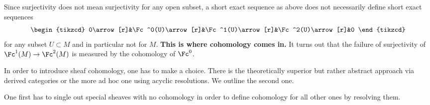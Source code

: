 \begin{remark}
	Since surjectivity does not mean surjectivity for any open subset, a short exact sequence as above does not necessarily define short exact sequences
	\[ \begin{tikzcd}
		0\arrow[r]&\Fc^0(U)\arrow[r]&\Fc^1(U)\arrow[r]&\Fc^2(U)\arrow[r]&0
	\end{tikzcd}\]
	for any subset $U\subset M$ and in particular not for $M$. \textbf{This is where cohomology comes in.} It turns out that the failure of surjectivity of $\Fc^1(M)\to\Fc^2(M)$ is measured by the cohomology of $\Fc^0$.
\end{remark}

In order to introduce sheaf cohomology, one has to make a choice. There is the theoretically superior but rather abstract approach via derived categories or the more ad hoc one using acyclic resolutions. We outline the second one.

One first has to single out special sheaves with no cohomology in order to define cohomology for all other ones by resolving them.


